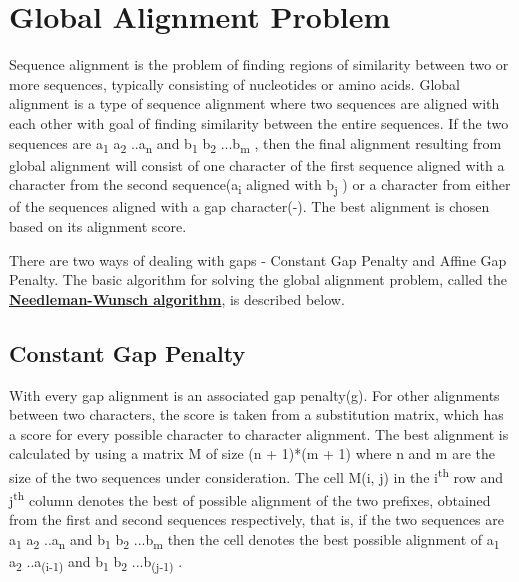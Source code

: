 \documentclass[a4paper,11pt]{report}
\begin{document}
\chapter{Global Alignment Problem}

Sequence alignment is the problem of finding regions of similarity between two or more sequences,
typically consisting of nucleotides or amino acids. Global alignment is a type of sequence alignment
where two sequences are aligned with each other with goal of finding similarity between the entire
sequences. If the two sequences are a\textsubscript{1} a\textsubscript{2} ..a\textsubscript{n} and b\textsubscript{1} b\textsubscript{2} ...b\textsubscript{m} , then the final alignment resulting from
global alignment will consist of one character of the first sequence aligned with a character from
the second sequence(a\textsubscript{i} aligned with b\textsubscript{j} ) or a character from either of the sequences aligned with
a gap character(-). The best alignment is chosen based on its alignment score.

There are two ways of dealing with
gaps - Constant Gap Penalty and Affine Gap Penalty. The basic algorithm for solving the global
alignment problem, called the \textbf{\underline{Needleman-Wunsch algorithm}}, is described below.

\section{Constant Gap Penalty}
With every gap alignment is an associated gap penalty(g). For other alignments between two characters, the score
is taken from a substitution matrix, which has a score for every possible character to character
alignment. The best alignment is calculated by using a matrix M of size (n + 1)*(m + 1) where
n and m are the size of the two sequences under consideration.
The cell M(i, j) in the i\textsuperscript{th} row and j\textsuperscript{th} column denotes the best of possible alignment of the two prefixes, obtained from the first
and second sequences respectively, that is, if the two sequences are a\textsubscript{1} a\textsubscript{2} ..a\textsubscript{n} and b\textsubscript{1} b\textsubscript{2} ...b\textsubscript{m} then the cell denotes the best possible alignment of a\textsubscript{1} a\textsubscript{2} ..a\textsubscript{(i-1)} and b\textsubscript{1} b\textsubscript{2} ...b\textsubscript{(j-1)} .
\end{document}
